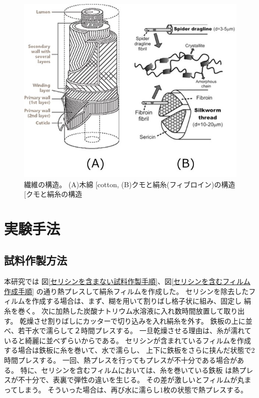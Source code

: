 \documentclass[dvipdfmx,12pt,a4paper]{jreport}
\makeatletter
\DeclareRobustCommand\cite{\unskip
    	\@ifnextchar[{\@tempswatrue\@citex}{\@tempswafalse\@citex[]}}
\makeatother
\begin{document}
			\begin{figure}[h]
				\centering
				\includegraphics[scale=0.8]{fiber_structures.jpg}
				\caption{繊維の構造。 
				(A)木綿\cite{cotton}, 
				(B)クモと絹糸(フィブロイン)の構造\cite{クモと絹糸の構造}}
			\end{figure}
	\chapter{実験手法}
		\section{試料作製方法}
		本研究では
		図\ref{セリシンを含まない試料作製手順}、図\ref{セリシンを含むフィルム作成手順}
		の通り熱プレスして絹糸フィルムを作成した。
		セリシンを除去したフィルムを作成する場合は、まず、糊を用いて割りばし格子状に組み、固定し
		絹糸を巻く。
		次に加熱した炭酸ナトリウム水溶液に入れ数時間放置して取り出す。
		乾燥させ割りばしにカッターで切り込みを入れ絹糸を外す。
		鉄板の上に並べ、若干水で濡らして２時間プレスする。
		一旦乾燥させる理由は、糸が濡れていると綺麗に並べずらいからである。
		セリシンが含まれているフィルムを作成する場合は鉄板に糸を巻いて、水で濡らし、
		上下に鉄板をさらに挟んだ状態で2時間プレスする。
		一回、熱プレスを行ってもプレスが不十分である場合がある。
		特に、セリシンを含むフィルムにおいては、糸を巻いている鉄板
		は熱プレスが不十分で、表裏で弾性の違いを生じる。
		その差が激しいとフィルムが丸まってしまう。
		そういった場合は、再び水に濡らし1枚の状態で熱プレスする。
\end{document}
